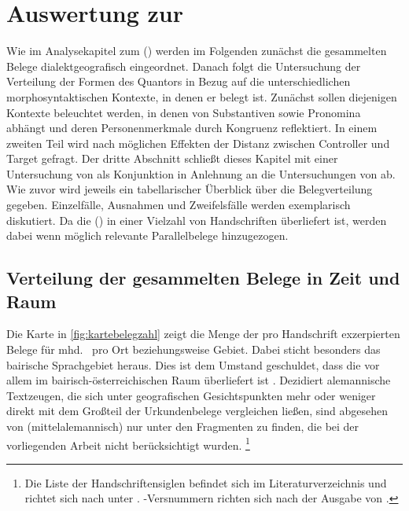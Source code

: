 \chapter{Auswertung zur }
\label{ch:kcanalyse}

Wie im Analysekapitel zum  (\CAO{}) werden im
Folgenden zunächst die gesammelten Belege dialektgeografisch eingeordnet.
Danach folgt die Untersuchung der Verteilung der Formen des Quantors
 in Bezug auf die unterschiedlichen morphosyntaktischen Kontexte,
in denen er belegt ist. Zunächst sollen diejenigen Kontexte beleuchtet werden,
in denen  von Substantiven sowie Pronomina abhängt und deren
Personenmerkmale durch Kongruenz reflektiert. In einem zweiten Teil wird nach
möglichen Effekten der Distanz zwischen Controller und Target gefragt. Der
dritte Abschnitt schließt dieses Kapitel mit einer Untersuchung von
 als Konjunktion in Anlehnung an die Untersuchungen von
\citet{askedal1974,gjelsten1980} ab. Wie zuvor wird jeweils ein tabellarischer
Überblick über die Belegverteilung gegeben. Einzelfälle, Ausnahmen und
Zweifelsfälle werden exemplarisch diskutiert. Da die 
(\citet{kc}) in einer Vielzahl von Handschriften überliefert ist, werden dabei
wenn möglich relevante Parallelbelege hinzugezogen.

\section{Verteilung der gesammelten Belege in Zeit und Raum}
\label{subsec:beiddispmap}

Die Karte in \cref{fig:kartebelegzahl} zeigt die Menge der pro Handschrift
exzerpierten Belege für mhd.\  pro Ort beziehungsweise Gebiet. Dabei
sticht besonders das bairische Sprachgebiet heraus. Dies ist dem Umstand
geschuldet, dass die \citet{kc} vor allem im bairisch-österreichischen Raum
überliefert ist \autocite{klein1988}. Dezidiert alemannische Textzeugen, die
sich unter geografischen Gesichtspunkten mehr oder weniger direkt mit dem
Großteil der Urkundenbelege vergleichen ließen, sind abgesehen von \citet{kc:K}
(mittelalemannisch) nur unter den Fragmenten zu finden, die bei der
vorliegenden Arbeit nicht berücksichtigt wurden.%
%
	\footnote{Die Liste der Handschriftensiglen befindet sich im
		Literaturverzeichnis und richtet sich nach  unter
		. \citet{kc}-Versnummern richten sich nach der
		Ausgabe von \nosh\citet{schroeder1895}.%
	}

